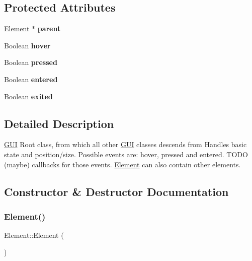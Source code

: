 \subsection*{Protected Attributes}
\begin{DoxyCompactItemize}
\item 
\mbox{\label{class_element_ae9b2bd00c9ba7a16c9981142c9e41fe3}} 
\hyperlink{class_element}{Element} $\ast$ {\bfseries parent}
\item 
\mbox{\label{class_element_aa96587b60db089a162b1186615fa1997}} 
Boolean {\bfseries hover}
\item 
\mbox{\label{class_element_a81423106e64f26ed16626fcf38ee4b09}} 
Boolean {\bfseries pressed}
\item 
\mbox{\label{class_element_a5eb5fc5fc18d6347994c44a530e6a417}} 
Boolean {\bfseries entered}
\item 
\mbox{\label{class_element_aaa022085afbbb22f0d8f7337191cf466}} 
Boolean {\bfseries exited}
\end{DoxyCompactItemize}


\subsection{Detailed Description}
\hyperlink{class_g_u_i}{G\+UI} Root class, from which all other \hyperlink{class_g_u_i}{G\+UI} classes descends from  Handles basic state and position/size. Possible events are\+: hover, pressed and entered. T\+O\+DO (maybe) callbacks for those events. \hyperlink{class_element}{Element} can also contain other elements. 

\subsection{Constructor \& Destructor Documentation}
\mbox{\label{class_element_ab0d0e20be9a36ae676202db753faeec9}} 
\subsubsection{\texorpdfstring{Element()}{Element()}}
{\footnotesize\ttfamily Element\+::\+Element (\begin{DoxyParamCaption}{ }\end{DoxyParamCaption})}

